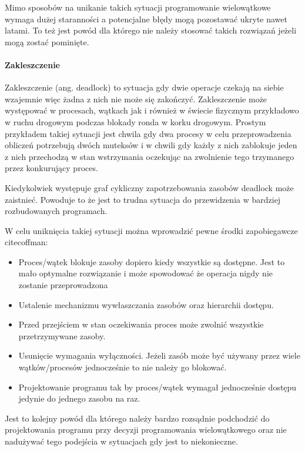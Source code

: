 \documentclass[a4paper,12pt]{article}
\begin{document}
Mimo sposobów na unikanie takich sytuacji programowanie wielowątkowe wymaga dużej staranności a potencjalne błędy mogą pozostawać ukryte nawet latami. To też jest powód dla którego nie należy stosować takich rozwiązań jeżeli mogą zostać pominięte\cite{multi thread problem}.
\paragraph{Zakleszczenie}

Zakleszczenie (ang. deadlock) to sytuacja gdy dwie operacje czekają na siebie wzajemnie więc żadna z nich nie może się zakończyć. 
Zakleszczenie może występować w procesach, wątkach jak i również w świecie fizycznym przykładowo w ruchu drogowym podczas blokady ronda w korku drogowym.  
Prostym przykładem takiej sytuacji jest chwila gdy dwa procesy w celu przeprowadzenia obliczeń potrzebują dwóch muteksów i w chwili gdy każdy z nich zablokuje jeden z nich przechodzą w stan wstrzymania oczekując na zwolnienie tego trzymanego przez konkurujący proces. 

 Kiedykolwiek występuje graf cykliczny zapotrzebowania zasobów deadlock może zaistnieć. 
 Powoduje to że jest to trudna sytuacja do przewidzenia w bardziej rozbudowanych programach.

W celu uniknięcia takiej sytuacji można wprowadzić pewne środki zapobiegawcze\\cite{coffman}:
\begin{itemize}
        \item Proces/wątek blokuje zasoby dopiero kiedy wszystkie są dostępne. Jest to mało optymalne rozwiązanie i może spowodować że operacja nigdy nie zostanie przeprowadzona
        \item Ustalenie mechanizmu wywłaszczania zasobów oraz hierarchii dostępu. 
        \item Przed przejściem w stan oczekiwania proces może zwolnić wszystkie przetrzymywane zasoby. 
        \item Usunięcie wymagania wyłączności. Jeżeli zasób może być używany przez wiele wątków/procesów jednocześnie to nie należy go blokować.  
        \item Projektowanie programu tak by proces/wątek wymagał jednocześnie dostępu jedynie do jednego zasobu na raz. 
\end{itemize} 

Jest to kolejny powód dla którego należy bardzo rozsądnie podchodzić do projektowania programu przy decyzji programowania wielowątkowego oraz nie nadużywać tego podejścia w sytuacjach gdy jest to niekonieczne. 
\end{document}
